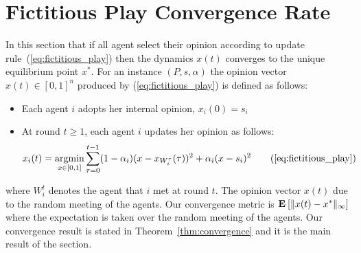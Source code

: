 \section{Fictitious Play Convergence Rate}\label{s:fictitious_convergence}
In this section that if all agent select their opinion according to
update rule~(\ref{eq:fictitious_play})
then the dynamics $x(t)$ converges to the unique equilibrium point $x^*$.
For an instance $(P,s,\alpha)$ the opinion vector $x(t) \in [0,1]^n$
produced by (\ref{eq:fictitious_play}) is defined as follows:
\begin{itemize}
 \item Each agent $i$ adopts her internal opinion, $x_i(0)=s_i$
 \item At round $t \geq 1$, each agent $i$ updates her opinion as follows:
 \begin{equation}
  x_i(t) =
  \argmin_{x \in [0,1]}\sum_{\tau=0}^{t-1}
  (1-\alpha_i)(x-x_{W_i^\tau}(\tau))^2+\alpha_i(x-s_i)^2 \tag{\ref{eq:fictitious_play}}
\end{equation}
\end{itemize}
where $W_i^t$ denotes the agent that $i$ met at round $t$. The opinion vector $x(t)$
due to the random meeting of the agents. Our convergence metric
is $\bm{\mathrm{E}}_{} \left[ \| x(t) - x^* \|_{\infty} \right]$
where the expectation is taken over the random meeting of the agents.
Our convergence result is stated in Theorem~\ref{thm:convergence}
and it is the main result of the section.

